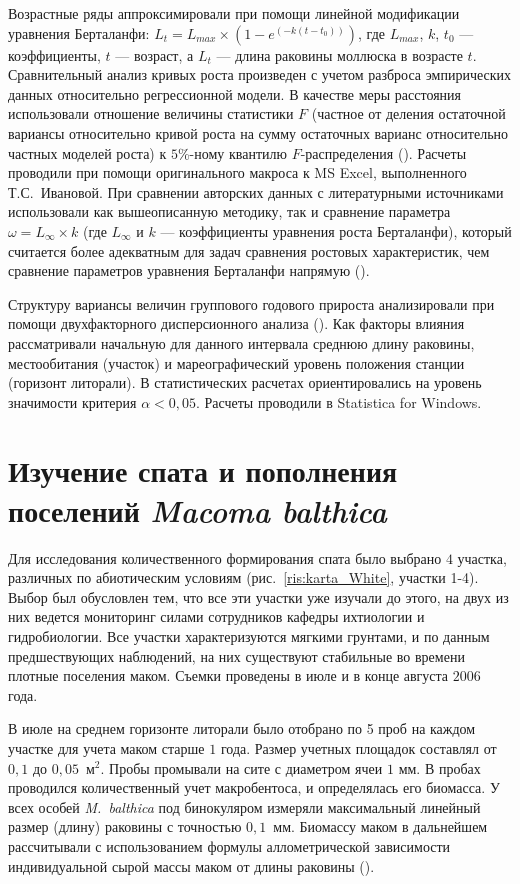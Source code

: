 Возрастные ряды аппроксимировали при помощи линейной модификации уравнения Берталанфи: $L_{t} = L_{max} \times (1 - e^{(-k(t - t_{0}))})$, где $L_{max}$, $k$, $t_{0}$ --- коэффициенты, $t$ --- возраст, а $L_{t}$ --- длина раковины моллюска в возрасте $t$.
Сравнительный анализ кривых роста произведен с учетом разброса эмпирических данных относительно регрессионной модели. 
В качестве меры расстояния использовали отношение величины статистики $F$ (частное от деления остаточной вариансы относительно кривой роста на сумму остаточных варианс относительно частных моделей роста) к $5$\%-ному квантилю $F$-распределения (\cite{Maximovich_1989}). 
Расчеты проводили при помощи оригинального макроса к MS Excel, выполненного Т.С.~Ивановой.
При сравнении авторских данных с литературными источниками использовали как вышеописанную методику, так и сравнение параметра $\omega = L_{\infty} \times k$ (где $L_{\infty}$ и $k$ --- коэффициенты уравнения роста Берталанфи), который считается более адекватным для задач сравнения ростовых характеристик, чем сравнение параметров уравнения Берталанфи напрямую (\cite{Appeldoorn_1983, Beukema_Meehan_1985}). 

Структуру вариансы величин группового годового прироста анализировали при помощи двухфакторного дисперсионного анализа (\cite{Chambers_Hastie_1991}). 
Как факторы влияния рассматривали начальную для данного интервала среднюю длину раковины, местообитания (участок) и мареографический уровень положения станции (горизонт литорали).
В статистических расчетах ориентировались на уровень значимости критерия $\alpha < 0,05$.
Расчеты проводили в Statistica for Windows.

\afterpage{\clearpage}

	\section{Изучение спата и пополнения поселений {\it Macoma balthica}}
Для исследования количественного формирования спата было выбрано $4$ участка, различных по абиотическим условиям (рис.~\ref{ris:karta_White}, участки 1-4). 
Выбор был обусловлен тем, что все эти участки уже изучали до этого, на двух из них ведется мониторинг силами сотрудников кафедры ихтиологии и гидробиологии. 
Все участки характеризуются мягкими грунтами, и по данным предшествующих наблюдений, на них существуют стабильные во времени плотные поселения маком.
Съемки проведены в июле и в конце августа $2006$ года.

В июле на среднем горизонте литорали было отобрано по 5 проб на каждом участке для учета маком старше $1$ года. 
Размер учетных площадок составлял от $0,1$ до $0,05$~м$^2$. 
Пробы промывали на сите с диаметром ячеи $1$ мм. 
В пробах проводился количественный учет макробентоса, и определялась его биомасса.
У всех особей \textit{M.~balthica} под бинокуляром измеряли максимальный линейный размер (длину) раковины с точностью $0,1$~мм. 
Биомассу маком в дальнейшем рассчитывали с использованием формулы аллометрической зависимости индивидуальной сырой массы маком от длины раковины (\cite{Maximovich_et_al_1993}).

